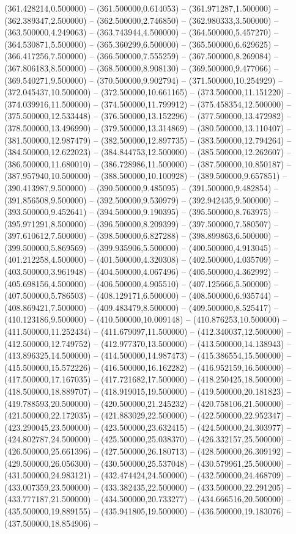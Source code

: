    (361.428214,0.500000) -- (361.500000,0.614053) -- (361.971287,1.500000) -- (362.389347,2.500000) -- (362.500000,2.746850) -- (362.980333,3.500000) -- (363.500000,4.249063) -- (363.743944,4.500000) -- (364.500000,5.457270) -- (364.530871,5.500000) -- (365.360299,6.500000) -- (365.500000,6.629625) -- (366.417256,7.500000) -- (366.500000,7.555259) -- (367.500000,8.269084) -- (367.806183,8.500000) -- (368.500000,8.908130) -- (369.500000,9.477066) -- (369.540271,9.500000) -- (370.500000,9.902794) -- (371.500000,10.254929) -- (372.045437,10.500000) -- (372.500000,10.661165) -- (373.500000,11.151220) -- (374.039916,11.500000) -- (374.500000,11.799912) -- (375.458354,12.500000) -- (375.500000,12.533448) -- (376.500000,13.152296) -- (377.500000,13.472982) -- (378.500000,13.496990) -- (379.500000,13.314869) -- (380.500000,13.110407) -- (381.500000,12.987479) -- (382.500000,12.897735) -- (383.500000,12.794264) -- (384.500000,12.622023) -- (384.844753,12.500000) -- (385.500000,12.262607) -- (386.500000,11.680010) -- (386.728986,11.500000) -- (387.500000,10.850187) -- (387.957940,10.500000) -- (388.500000,10.100928) -- (389.500000,9.657851) -- (390.413987,9.500000) -- (390.500000,9.485095) -- (391.500000,9.482854) -- (391.856508,9.500000) -- (392.500000,9.530979) -- (392.942435,9.500000) -- (393.500000,9.452641) -- (394.500000,9.190395) -- (395.500000,8.763975) -- (395.971291,8.500000) -- (396.500000,8.209399) -- (397.500000,7.580507) -- (397.610612,7.500000) -- (398.500000,6.827288) -- (398.899863,6.500000) -- (399.500000,5.869569) -- (399.935906,5.500000) -- (400.500000,4.913045) -- (401.212258,4.500000) -- (401.500000,4.320308) -- (402.500000,4.035709) -- (403.500000,3.961948) -- (404.500000,4.067496) -- (405.500000,4.362992) -- (405.698156,4.500000) -- (406.500000,4.905510) -- (407.125666,5.500000) -- (407.500000,5.786503) -- (408.129171,6.500000) -- (408.500000,6.935744) -- (408.869421,7.500000) -- (409.483479,8.500000) -- (409.500000,8.525417) -- (410.123186,9.500000) -- (410.500000,10.009148) -- (410.876253,10.500000) -- (411.500000,11.252434) -- (411.679097,11.500000) -- (412.340037,12.500000) -- (412.500000,12.749752) -- (412.977370,13.500000) -- (413.500000,14.138943) -- (413.896325,14.500000) -- (414.500000,14.987473) -- (415.386554,15.500000) -- (415.500000,15.572226) -- (416.500000,16.162282) -- (416.952159,16.500000) -- (417.500000,17.167035) -- (417.721682,17.500000) -- (418.250425,18.500000) -- (418.500000,18.889707) -- (418.919015,19.500000) -- (419.500000,20.181823) -- (419.788593,20.500000) -- (420.500000,21.245232) -- (420.758106,21.500000) -- (421.500000,22.172035) -- (421.883029,22.500000) -- (422.500000,22.952347) -- (423.290045,23.500000) -- (423.500000,23.632415) -- (424.500000,24.303977) -- (424.802787,24.500000) -- (425.500000,25.038370) -- (426.332157,25.500000) -- (426.500000,25.661396) -- (427.500000,26.180713) -- (428.500000,26.309192) -- (429.500000,26.056300) -- (430.500000,25.537048) -- (430.579961,25.500000) -- (431.500000,24.983121) -- (432.474424,24.500000) -- (432.500000,24.468709) -- (433.007359,23.500000) -- (433.382435,22.500000) -- (433.500000,22.291205) -- (433.777187,21.500000) -- (434.500000,20.733277) -- (434.666516,20.500000) -- (435.500000,19.889155) -- (435.941805,19.500000) -- (436.500000,19.183076) -- (437.500000,18.854906) -- 